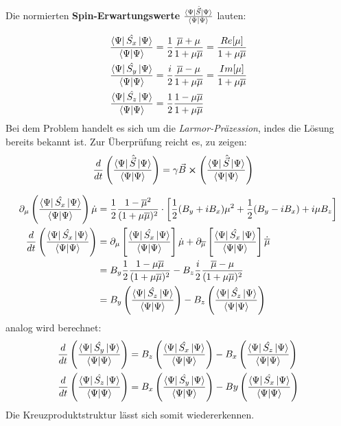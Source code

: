 \documentclass[12pt]{article}
\def\N{\bra{\Psi}\ket{\Psi}}
\def\muk{\overline{\mu}}
\begin{document}
Die normierten \textbf{Spin-Erwartungswerte} $\frac{\bra{\Psi}\hat{\vec{S}}\ket{\Psi}}{\N}$ lauten:

\begin{align}
    \frac{\bra{\Psi}\hat{S_x}\ket{\Psi}}{\N} &= \frac{1}{2}\frac{\muk + \mu}{1+\mu\muk} = \frac{Re[\mu]}{1 + \mu\muk} \\
    \frac{\bra{\Psi}\hat{S_y}\ket{\Psi}}{\N} &= \frac{i}{2}\frac{\muk - \mu}{1+\mu\muk} = \frac{Im[\mu]}{1 + \mu\muk} \\
    \frac{\bra{\Psi}\hat{S_z}\ket{\Psi}}{\N} &= \frac{1}{2}\frac{1 - \mu\muk}{1 + \mu\muk}  \\
\end{align}
Bei dem Problem handelt es sich um die \textit{Larmor-Präzession}, indes die Lösung bereits bekannt ist. Zur Überprüfung reicht es,
 zu zeigen:
\begin{align}
    \frac{d}{dt}\left(\frac{\bra{\Psi}\hat{\vec{S}}\ket{\Psi}}{\N}\right) &= \gamma\vec{B} \cross \left(\frac{\bra{\Psi}\hat{\vec{S}}\ket{\Psi}}{\N}\right)
\end{align}


\begin{align}
    \partial_\mu \left(\frac{\bra{\Psi}\hat{S_x}\ket{\Psi}}{\N}\right)\dot{\mu} &= \frac{1}{2}\frac{1-\muk^2}{(1+\mu\muk)^2}\cdot\left[\frac{1}{2}(B_y + iB_x)\mu^2 + \frac{1}{2}(B_y - iB_x) +i\mu B_z\right]  \\
    \frac{d}{dt}\left(\frac{\bra{\Psi}\hat{S_x}\ket{\Psi}}{\N}\right) &= \partial_{\mu}\left[\frac{\bra{\Psi}\hat{S_x}\ket{\Psi}}{\N}\right]\dot{\mu} + \partial_{\muk}\left[\frac{\bra{\Psi}\hat{S_x}\ket{\Psi}}{\N}\right]\dot{\muk}\\
    &= B_y \frac{1}{2}\frac{1-\mu\muk}{(1+\mu\muk)^2} - B_z \frac{i}{2}\frac{\muk -\mu}{(1+\mu\muk)^2}    \\
    &= B_y\left(\frac{\bra{\Psi}\hat{S_z}\ket{\Psi}}{\N}\right) - B_z\left(\frac{\bra{\Psi}\hat{S_z}\ket{\Psi}}{\N}\right)
\end{align}
analog wird berechnet:
\begin{align}
    \frac{d}{dt}\left(\frac{\bra{\Psi}\hat{S_y}\ket{\Psi}}{\N}\right) &= B_z\left(\frac{\bra{\Psi}\hat{S_x}\ket{\Psi}}{\N}\right) - B_x\left(\frac{\bra{\Psi}\hat{S_z}\ket{\Psi}}{\N}\right)\\
    \frac{d}{dt}\left(\frac{\bra{\Psi}\hat{S_z}\ket{\Psi}}{\N}\right) &= B_x\left(\frac{\bra{\Psi}\hat{S_y}\ket{\Psi}}{\N}\right) - By\left(\frac{\bra{\Psi}\hat{S_x}\ket{\Psi}}{\N}\right)
\end{align}
Die Kreuzproduktstruktur lässt sich somit wiedererkennen.
\newpage
\end{document}
